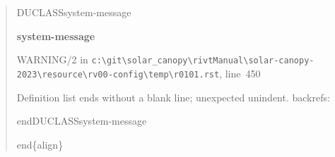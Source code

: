 \documentclass[12pt,notitle,letterpaper]{report}
\newenvironment{DUclass}[1]%
  {%
   \def\DocutilsClassFunctionName{DUCLASS#1}
     \csname \DocutilsClassFunctionName \endcsname}%
  {\csname end\DocutilsClassFunctionName \endcsname}%
\newenvironment{DUadmonition}%
  {\begin{center}
     \begin{lrbox}{\DUadmonitionbox}
       \begin{minipage}{0.9\linewidth}
  }%
  {    \end{minipage}
     \end{lrbox}
     \fbox{\usebox{\DUadmonitionbox}}
   \end{center}
  }
\providecommand*{\DUtitle}[1]{%
  \smallskip\noindent\textbf{#1}\smallskip}
\begin{document}
\begin{quote}
\begin{description}
\end{description}

\begin{DUclass}{system-message}
\begin{DUadmonition}
\DUtitle{system-message
}

{\color{red}WARNING/2} in \texttt{c:\textbackslash{}git\textbackslash{}solar\_canopy\textbackslash{}rivtManual\textbackslash{}solar-canopy-2023\textbackslash{}resource\textbackslash{}rv00-config\textbackslash{}temp\textbackslash{}r0101.rst}, line~450

Definition list ends without a blank line; unexpected unindent.
backrefs: \end{DUadmonition}
\end{DUclass}

end\{align\}
\end{quote}
\end{document}
